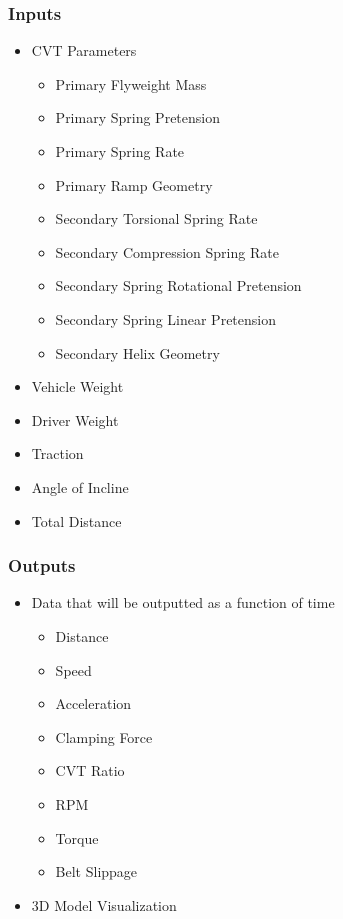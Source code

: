 \documentclass{article}
\begin{document}
\subsubsection{Inputs}
\begin{itemize}
    \item CVT Parameters
    \begin{itemize}
        \item Primary Flyweight Mass
        \item Primary Spring Pretension
        \item Primary Spring Rate
        \item Primary Ramp Geometry
        \item Secondary Torsional Spring Rate
        \item Secondary Compression Spring Rate
        \item Secondary Spring Rotational Pretension
        \item Secondary Spring Linear Pretension
        \item Secondary Helix Geometry
    \end{itemize}
    \item Vehicle Weight
    \item Driver Weight
    \item Traction
    \item Angle of Incline
    \item Total Distance
\end{itemize}
\subsubsection{Outputs}
\begin{itemize}
    \item Data that will be outputted as a function of time
    \begin{itemize}
        \item Distance
        \item Speed
        \item Acceleration
        \item Clamping Force
        \item CVT Ratio
        \item RPM
        \item Torque
        \item Belt Slippage
    \end{itemize}
    \item 3D Model Visualization
\end{itemize}
\end{document}
